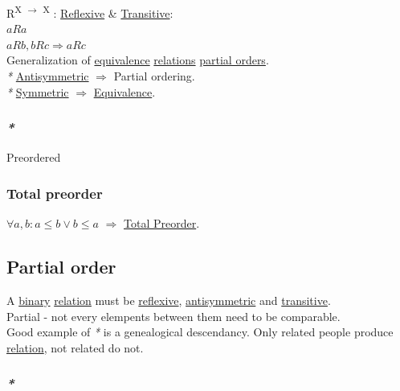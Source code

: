 \documentclass[a4paper,14pt,oneside]{book}
\begin{document}
R\textsuperscript{X \(\to\) X} : \hyperref[org2e2e609]{Reflexive} \& \hyperref[org055837d]{Transitive}:\\
\(aRa\)\\
\(aRb, bRc \Rightarrow aRc\)\\

Generalization of \hyperref[org663eda7]{equivalence} \hyperref[org7f47507]{relations} \hyperref[orgcc988e8]{partial orders}.\\

\emph{*} \hyperref[orged08395]{Antisymmetric} \(\Rightarrow\) Partial ordering.\\
\emph{*} \hyperref[org22264e6]{Symmetric} \(\Rightarrow\) \hyperref[org663eda7]{Equivalence}.\\

\subsubsection{\emph{*}}
\label{sec:org80631a2}

\label{orgd804c52}Preordered\\

\subsubsection{\label{orgdb79bec}Total preorder}
\label{sec:orgcdceb33}

\(\forall a,b : a \le b \lor b \le a\) \(\Rightarrow\) \hyperref[orgdb79bec]{Total Preorder}.\\

\subsection{\label{orgc2b3cb5}Partial order}
\label{sec:org767e4d0}

A \hyperref[orgd0575cd]{binary} \hyperref[org70d7aba]{relation} must be \hyperref[org2e2e609]{reflexive}, \hyperref[orged08395]{antisymmetric} and \hyperref[org055837d]{transitive}.\\

Partial - not every elempents between them need to be comparable.\\

Good example of \emph{*} is a genealogical descendancy. Only related people produce \hyperref[org70d7aba]{relation}, not related do not.\\

\subsubsection{\emph{*}}
\label{sec:org8d232d7}
\end{document}
